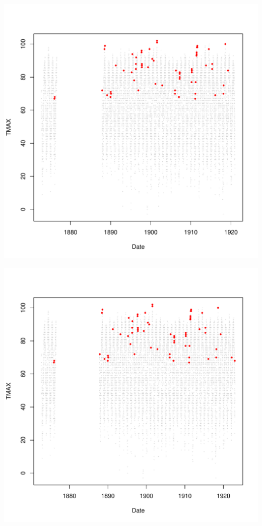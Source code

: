 \documentclass{article}\usepackage[]{graphicx}\usepackage[]{color}
\makeatletter
\def\maxwidth{ %
  \ifdim\Gin@nat@width>\linewidth
    \linewidth
  \else
    \Gin@nat@width
  \fi
}
\newenvironment{knitrout}{}{} %
\makeatother
\begin{document}
\begin{knitrout}
\includegraphics[width=\maxwidth]{figure/unnamed-chunk-4-20} 

\includegraphics[width=\maxwidth]{figure/unnamed-chunk-4-21} 


\end{knitrout}
\end{document}
